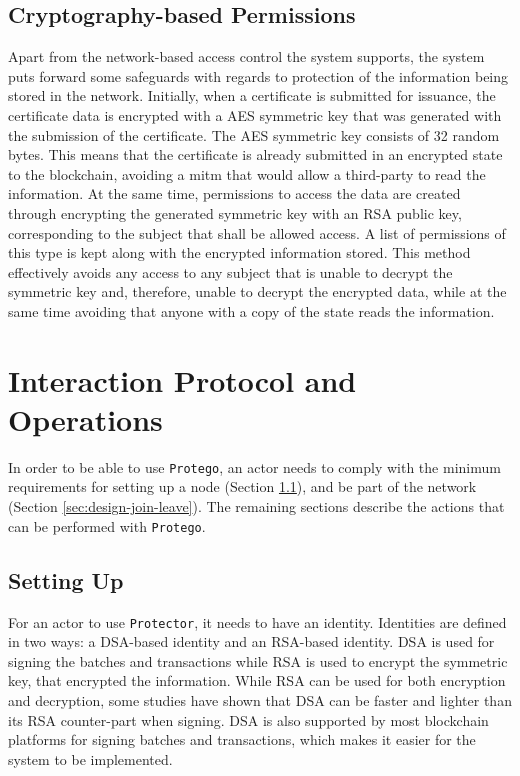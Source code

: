 \subsection{Cryptography-based Permissions}

Apart from the network-based access control the system supports, the system puts forward some safeguards with regards to protection of the information being stored in the network. Initially, when a certificate is submitted for issuance, the certificate data is encrypted with a AES symmetric key that was generated with the submission of the certificate. The AES symmetric key consists of 32 random bytes. This means that the certificate is already submitted in an encrypted state to the blockchain, avoiding a \gls{mitm} that would allow a third-party to read the information. At the same time, permissions to access the data are created through encrypting the generated symmetric key with an RSA public key, corresponding to the subject that shall be allowed access. A list of permissions of this type is kept along with the encrypted information stored. This method effectively avoids any access to any subject that is unable to decrypt the symmetric key and, therefore, unable to decrypt the encrypted data, while at the same time avoiding that anyone with a copy of the state reads the information.

\section{Interaction Protocol and Operations}
\label{sec:design-interaction}

In order to be able to use \texttt{Protego}, an actor needs to comply with the minimum requirements for setting up a node (Section \ref{sec:design-setup}), and be part of the network (Section \ref{sec:design-join-leave}). The remaining sections describe the actions that can be performed with \texttt{Protego}.

\subsection{Setting Up}
\label{sec:design-setup}

For an actor to use \texttt{Protector}, it needs to have an identity. Identities are defined in two ways: a DSA-based identity and an RSA-based identity. DSA is used for signing the batches and transactions while RSA is used to encrypt the symmetric key, that encrypted the information. While RSA can be used for both encryption and decryption, some studies have shown that DSA can be faster and lighter than its RSA counter-part when signing. DSA is also supported by most blockchain platforms for signing batches and transactions, which makes it easier for the system to be implemented.


